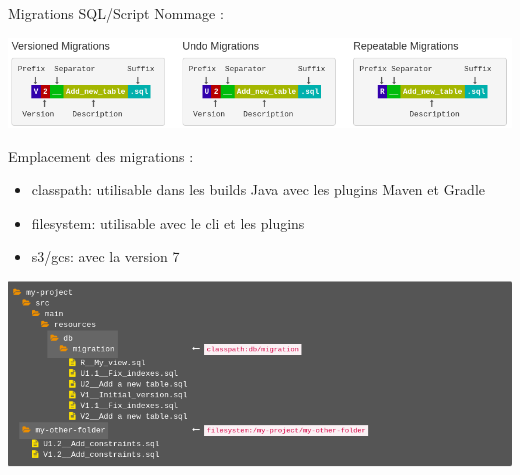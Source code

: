 \documentclass[slidestop,compress,11pt,xcolor=dvipsnames,french]{beamer}
\begin{document}
\begin{frame}{Migrations SQL/Script}
Nommage :
\begin{center}
 \includegraphics[scale=0.3]{nommage_sql.png}
\end{center}

Emplacement des migrations :
\begin{itemize}
 \item classpath: utilisable dans les builds Java avec les plugins Maven et Gradle
 \item filesystem: utilisable avec le cli et les plugins
 \item s3/gcs: avec la version 7
\end{itemize}

\begin{center}
 \includegraphics[scale=0.2,keepaspectratio=true]{locations_sql.png}
\end{center}
\end{frame}
\end{document}
